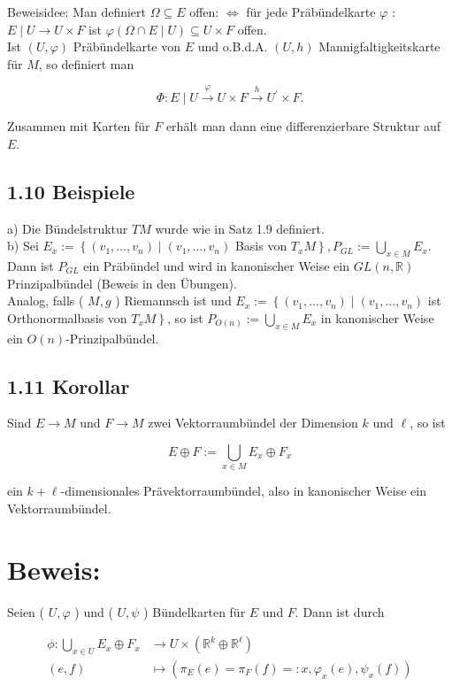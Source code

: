 \documentclass[10pt, letterpaper]{article}
\begin{document}
Beweisidee: Man definiert $\Omega \subseteq E$ offen: $\Leftrightarrow$ für jede Präbündelkarte $\varphi$ : $E \mid U \rightarrow U \times F$ ist $\varphi(\Omega \cap E \mid U) \subseteq U \times F$ offen.\\
Ist $(U, \varphi)$ Präbündelkarte von $E$ und o.B.d.A. $(U, h)$ Mannigfaltigkeitskarte für $M$, so definiert man

$$
\Phi: E \mid U \xrightarrow{\varphi} U \times F \xrightarrow{h} U^{\prime} \times F .
$$

Zusammen mit Karten für $F$ erhält man dann eine differenzierbare Struktur auf $E$.

\subsection*{1.10 Beispiele}
a) Die Bündelstruktur $T M$ wurde wie in Satz 1.9 definiert.\\
b) Sei $E_{x}:=\left\{\left(v_{1}, \ldots, v_{n}\right) \mid\left(v_{1}, \ldots, v_{n}\right)\right.$ Basis von $\left.T_{x} M\right\}, P_{G L}:=\bigcup_{x \in M} E_{x}$. Dann ist $P_{G L}$ ein Präbündel und wird in kanonischer Weise ein $G L(n, \mathbb{R})$ Prinzipalbündel (Beweis in den Übungen).\\
Analog, falls ( $M, g$ ) Riemannsch ist und $E_{x}:=\left\{\left(v_{1}, \ldots, v_{n}\right) \mid\left(v_{1}, \ldots, v_{n}\right)\right.$ ist Orthonormalbasis von $\left.T_{x} M\right\}$, so ist $P_{O(n)}:=\bigcup_{x \in M} E_{x}$ in kanonischer Weise ein $O(n)$-Prinzipalbündel.

\subsection*{1.11 Korollar}
Sind $E \rightarrow M$ und $F \rightarrow M$ zwei Vektorraumbündel der Dimension $k$ und $\ell$, so ist

$$
E \oplus F:=\bigcup_{x \in M} E_{x} \oplus F_{x}
$$

ein $k+\ell$-dimensionales Prävektorraumbündel, also in kanonischer Weise ein Vektorraumbündel.

\section*{Beweis:}
Seien ( $U, \varphi$ ) und ( $U, \psi$ ) Bündelkarten für $E$ und $F$. Dann ist durch

$$
\begin{aligned}
\phi: \bigcup_{x \in U} E_{x} \oplus F_{x} & \rightarrow U \times\left(\mathbb{R}^{k} \oplus \mathbb{R}^{\ell}\right) \\
(e, f) & \mapsto\left(\pi_{E}(e)=\pi_{F}(f)=: x, \varphi_{x}(e), \psi_{x}(f)\right)
\end{aligned}
$$
\end{document}
